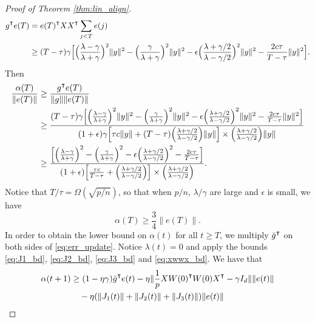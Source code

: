 \begin{proof}[Proof of Theorem \ref{thm:lin_align}]
\begin{equation*}
\begin{aligned}
    g\transpose e(T)
    &= e(T)\transpose XX\transpose \sum_{j<T}e(j) \\
    &\geq (T-\tau)\gamma\Big[\Big(\frac{\lambda-\gamma}{\lambda+\gamma}\Big)^2\|y\|^2-\Big(\frac{\gamma}{\lambda+\gamma}\Big)^2\|y\|^2-\epsilon\Big(\frac{\lambda+\gamma/2}{\lambda-\gamma/2}\Big)^2\|y\|^2- \frac{2c\tau}{T-\tau}\|y\|^2\Big].
\end{aligned}
\end{equation*}
Then
\begin{equation*}
\begin{aligned}
\frac{\alpha(T)}{\|e(T)\|} &\geq \frac{g\transpose e(T)}{\|g\|\|e(T)\|} \\
&\geq \frac{(T-\tau)\gamma\Big[\Big(\frac{\lambda-\gamma}{\lambda+\gamma}\Big)^2\|y\|^2-\Big(\frac{\gamma}{\lambda+\gamma}\Big)^2\|y\|^2-\epsilon\Big(\frac{\lambda+\gamma/2}{\lambda-\gamma/2}\Big)^2\|y\|^2- \frac{2c\tau}{T-\tau}\|y\|^2\Big]}{(1+\epsilon)\gamma\Big[\tau c\|y\|+ (T-\tau)\Big(\frac{\lambda+\gamma/2}{\lambda-\gamma/2}\Big)\|y\|\Big]\times\Big(\frac{\lambda+\gamma/2}{\lambda-\gamma/2}\Big)\|y\|} \\
&\geq \frac{\Big[\Big(\frac{\lambda-\gamma}{\lambda+\gamma}\Big)^2-\Big(\frac{\gamma}{\lambda+\gamma}\Big)^2-\epsilon\Big(\frac{\lambda+\gamma/2}{\lambda-\gamma/2}\Big)^2- \frac{2c\tau}{T-\tau}\Big]}{(1+\epsilon)\Big[\frac{\tau c}{T-\tau}+ \Big(\frac{\lambda+\gamma/2}{\lambda-\gamma/2}\Big)\Big]\times\Big(\frac{\lambda+\gamma/2}{\lambda-\gamma/2}\Big)}.
\end{aligned}
\end{equation*}
Notice that $T/\tau = \Omega(\sqrt{p/n})$, so that when $p/n$, $\lambda/\gamma$ are large and $\epsilon$ is small, we have
\begin{equation}
\label{eq:alphaT_eT}
    \alpha(T)\geq \frac{3}{4}\|e(T)\|.
\end{equation}
In order to obtain the lower bound on $\alpha(t)$ for all $t\geq T$, we multiply $\bar{g}\transpose$ on both sides of \eqref{eq:err_update}. Notice $\lambda(t) = 0$ and apply the bounds \eqref{eq:J1_bd}, \eqref{eq:J2_bd}, \eqref{eq:J3_bd} and \eqref{eq:xwwx_bd}. We have that
\begin{equation*}
\begin{aligned}
    \alpha(t+1)
    &\geq (1-\eta\gamma)\bar{g}\transpose e(t) - \eta\|\frac{1}{p}XW(0)\transpose W(0)X\transpose-\gamma I_d\|\|e(t)\|\\
    &\quad-\eta(\|J_1(t)\|+\|J_2(t)\|+\|J_3(t)\|)\|e(t)\| \\

\end{aligned}
\end{equation*}
\end{proof}
